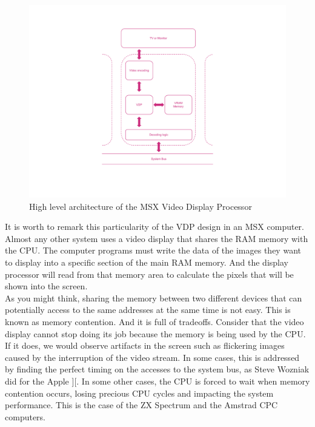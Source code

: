 \begin{figure}
	\centering
	\includegraphics[width=1\linewidth,trim={0cm 100 0 100}]{images/figures/msx-arch-vdp}
	\caption{High level architecture of the MSX Video Display Processor}
	\label{fig:msx-arch-vdp}
\end{figure}

It is worth to remark this particularity of the VDP design in an MSX computer. Almost any other system uses a video display that shares the RAM memory with the CPU. The computer programs must write the data of the images they want to display into a specific section of the main RAM memory. And the display processor will read from that memory area to calculate the pixels that will be shown into the screen. \\

As you might think, sharing the memory between two different devices that can potentially access to the same addresses at the same time is not easy. This is known as memory contention. And it is full of tradeoffs. Consider that the video display cannot stop doing its job because the memory is being used by the CPU. If it does, we would observe artifacts in the screen such as flickering images caused by the interruption of the video stream. In some cases, this is addressed by finding the perfect timing on the accesses to the system bus, as Steve Wozniak did for the Apple ][. In some other cases, the CPU is forced to wait when memory contention occurs, losing precious CPU cycles and impacting the system performance. This is the case of the ZX Spectrum and the Amstrad CPC computers. \\

